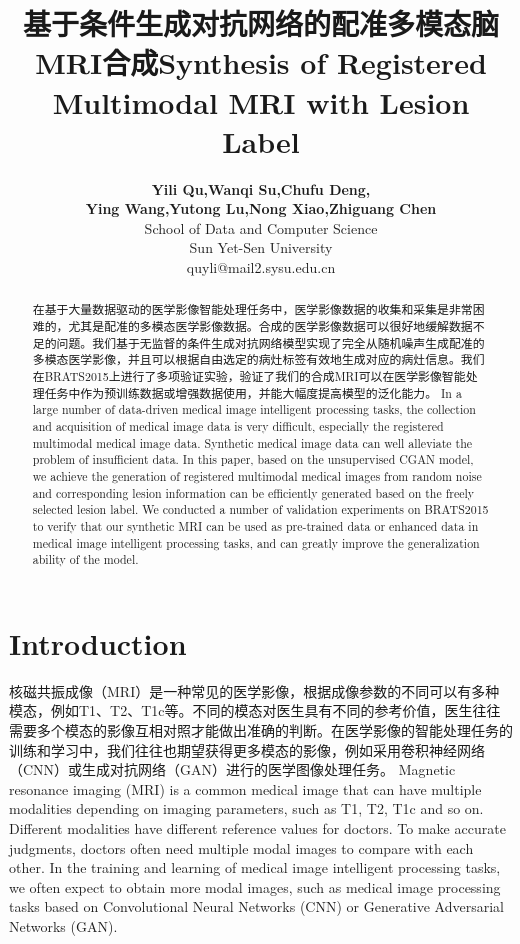 \documentclass[letterpaper]{article} %
\title{基于条件生成对抗网络的配准多模态脑MRI合成Synthesis of Registered Multimodal MRI with Lesion Label }
\author{\Large \textbf{Yili Qu,Wanqi Su,Chufu Deng,}\\ \Large \textbf{Ying Wang,Yutong Lu,Nong Xiao,Zhiguang Chen}\\  %
School of Data and Computer Science\\ Sun Yet-Sen University\\	
quyli@mail2.sysu.edu.cn%
}
\begin{document}
\maketitle

\begin{abstract}
在基于大量数据驱动的医学影像智能处理任务中，医学影像数据的收集和采集是非常困难的，尤其是配准的多模态医学影像数据。合成的医学影像数据可以很好地缓解数据不足的问题。我们基于无监督的条件生成对抗网络模型实现了完全从随机噪声生成配准的多模态医学影像，并且可以根据自由选定的病灶标签有效地生成对应的病灶信息。我们在BRATS2015上进行了多项验证实验，验证了我们的合成MRI可以在医学影像智能处理任务中作为预训练数据或增强数据使用，并能大幅度提高模型的泛化能力。
In a large number of data-driven medical image intelligent processing tasks, the collection and acquisition of medical image data is very difficult, especially the registered multimodal medical image data. Synthetic medical image data can well alleviate the problem of insufficient data. In this paper, based on the unsupervised CGAN model, we achieve the generation of registered multimodal medical images from random noise and corresponding lesion information can be efficiently generated based on the freely selected lesion label. We conducted a number of validation experiments on BRATS2015 to verify that our synthetic MRI can be used as pre-trained data or enhanced data in medical image intelligent processing tasks, and can greatly improve the generalization ability of the model.
\end{abstract}
	
\section{Introduction}
核磁共振成像（MRI）是一种常见的医学影像，根据成像参数的不同可以有多种模态，例如T1、T2、T1c等。不同的模态对医生具有不同的参考价值，医生往往需要多个模态的影像互相对照才能做出准确的判断。在医学影像的智能处理任务的训练和学习中，我们往往也期望获得更多模态的影像，例如采用卷积神经网络（CNN）\cite{86krizhevsky2012imagenet}或生成对抗网络（GAN）\cite{25goodfellow2014generative}进行的医学图像处理任务。
Magnetic resonance imaging (MRI) is a common medical image that can have multiple modalities depending on imaging parameters, such as T1, T2, T1c and so on. Different modalities have different reference values for doctors. To make accurate judgments, doctors often need multiple modal images to compare with each other. In the training and learning of medical image intelligent processing tasks, we often expect to obtain more modal images, such as medical image processing tasks based on Convolutional Neural Networks (CNN)\cite{86krizhevsky2012imagenet} or Generative Adversarial Networks (GAN)\cite{25goodfellow2014generative}. 
\end{document}
